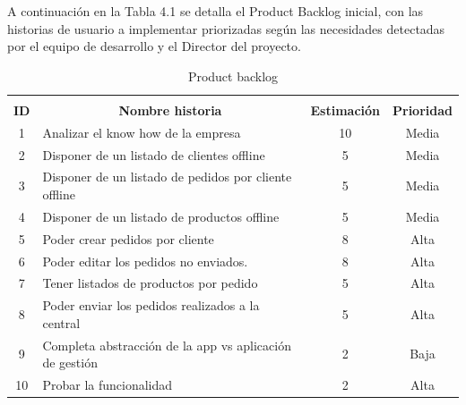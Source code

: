 A continuación en la Tabla 4.1 se detalla el Product Backlog inicial, con las historias  de usuario a implementar priorizadas según las necesidades detectadas por el equipo de desarrollo y el Director del proyecto. 

\begin{table}[H]
	\centering
	\caption{Product backlog}
	\label{Product backlog}
	\renewcommand{\arraystretch}{2}
	\begin{tabular}{cccc}
		\multicolumn{4}{c}{\cellcolor{tittletable}{\color{white} \textbf{Product Backlog}}} \\
		\rowcolor{HeaderCol} 
		{\color{white} \textbf{ID}} & {\color{white}  \textbf{Nombre historia}} & {\color{white} \textbf{Estimación}} & {\color{white} \textbf{Prioridad}} \\ 
		\hline
		
		\multicolumn{1}{|c|}{1} & \multicolumn{1}{l|}{Analizar el know how de la empresa} & \multicolumn{1}{c|}{10} & \multicolumn{1}{c|}{Media} \\ \hline
		
		\multicolumn{1}{|c|}{2} & \multicolumn{1}{l|}{Disponer de un listado de clientes offline} & \multicolumn{1}{c|}{5} & \multicolumn{1}{c|}{Media} \\ \hline
	
		\multicolumn{1}{|c|}{3} & \multicolumn{1}{l|}{Disponer de un listado de pedidos por cliente offline} & \multicolumn{1}{c|}{5} & \multicolumn{1}{c|}{Media} \\ \hline
			
		\multicolumn{1}{|c|}{4} & \multicolumn{1}{l|}{Disponer de un listado de productos offline} & \multicolumn{1}{c|}{5} & \multicolumn{1}{c|}{Media} \\ \hline
			
		\multicolumn{1}{|c|}{5} & \multicolumn{1}{l|}{Poder crear pedidos por cliente} & \multicolumn{1}{c|}{8} & \multicolumn{1}{c|}{Alta} \\ \hline
				
		\multicolumn{1}{|c|}{6} & \multicolumn{1}{l|}{Poder editar los pedidos no enviados.} & \multicolumn{1}{c|}{8} & \multicolumn{1}{c|}{Alta} \\ \hline
					
		\multicolumn{1}{|c|}{7} & \multicolumn{1}{l|}{Tener listados de productos por pedido} & \multicolumn{1}{c|}{5} & \multicolumn{1}{c|}{Alta} \\ \hline
						
		\multicolumn{1}{|c|}{8} & \multicolumn{1}{l|}{Poder enviar los pedidos realizados a la central} & \multicolumn{1}{c|}{5} & \multicolumn{1}{c|}{Alta} \\ \hline
		
		\multicolumn{1}{|c|}{9} & \multicolumn{1}{l|}{Completa abstracción de la app vs aplicación de gestión} & \multicolumn{1}{c|}{2} & \multicolumn{1}{c|}{Baja} \\ \hline
		
		\multicolumn{1}{|c|}{10} & \multicolumn{1}{l|}{Probar la funcionalidad} & \multicolumn{1}{c|}{2} & \multicolumn{1}{c|}{Alta} \\ \hline
	\end{tabular}
\end{table}

